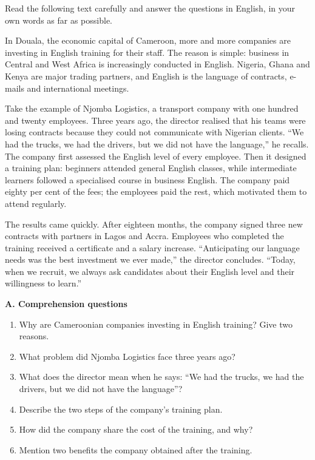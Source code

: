\documentclass[11pt]{article}
\newcounter{popsec}
\newcounter{popsub}
\newcommand{\courssub}[1]{%
  \stepcounter{popsub}%
  \par\vspace{9pt}\noindent{\popxbold\fontsize{11.5}{13}\selectfont\color{popink}{\color{poporange}\thepopsec.\thepopsub}\hspace{6pt}#1}\par\nopagebreak\vspace{4pt}
}
\begin{document}
\courssub{Je me prépare au Bac}

\begin{exercice}
Read the following text carefully and answer the questions in English, in your own words as far as possible.

\begin{textebox}
In Douala, the economic capital of Cameroon, more and more companies are investing in English training for their staff. The reason is simple: business in Central and West Africa is increasingly conducted in English. Nigeria, Ghana and Kenya are major trading partners, and English is the language of contracts, e-mails and international meetings.

Take the example of Njomba Logistics, a transport company with one hundred and twenty employees. Three years ago, the director realised that his teams were losing contracts because they could not communicate with Nigerian clients. “We had the trucks, we had the drivers, but we did not have the language,” he recalls. The company first assessed the English level of every employee. Then it designed a training plan: beginners attended general English classes, while intermediate learners followed a specialised course in business English. The company paid eighty per cent of the fees; the employees paid the rest, which motivated them to attend regularly.

The results came quickly. After eighteen months, the company signed three new contracts with partners in Lagos and Accra. Employees who completed the training received a certificate and a salary increase. “Anticipating our language needs was the best investment we ever made,” the director concludes. “Today, when we recruit, we always ask candidates about their English level and their willingness to learn.”
\end{textebox}

\textbf{A. Comprehension questions}
\begin{enumerate}
\item Why are Cameroonian companies investing in English training? Give two reasons.
\item What problem did Njomba Logistics face three years ago?
\item What does the director mean when he says: “We had the trucks, we had the drivers, but we did not have the language”?
\item Describe the two steps of the company's training plan.
\item How did the company share the cost of the training, and why?
\item Mention two benefits the company obtained after the training.
\end{enumerate}


\end{exercice}
\end{document}
